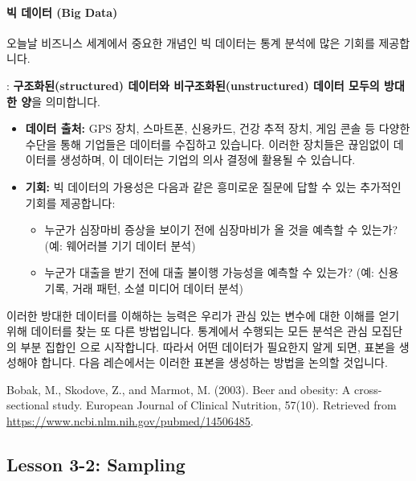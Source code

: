 \documentclass[11pt,a4paper]{article}
\begin{document}
\paragraph{빅 데이터 (Big Data)}
오늘날 비즈니스 세계에서 중요한 개념인 빅 데이터는 통계 분석에 많은 기회를 제공합니다.

\begin{tcolorbox}[mybox, title={빅 데이터 (Big Data)}]
: \textbf{구조화된(structured) 데이터와 비구조화된(unstructured) 데이터 모두의 방대한 양}을 의미합니다.
\end{tcolorbox}

\begin{itemize}
    \item \textbf{데이터 출처:} GPS 장치, 스마트폰, 신용카드, 건강 추적 장치, 게임 콘솔 등 다양한 수단을 통해 기업들은 데이터를 수집하고 있습니다. 이러한 장치들은 끊임없이 데이터를 생성하며, 이 데이터는 기업의 의사 결정에 활용될 수 있습니다.
    \item \textbf{기회:} 빅 데이터의 가용성은 다음과 같은 흥미로운 질문에 답할 수 있는 추가적인 기회를 제공합니다:
    \begin{itemize}
        \item 누군가 심장마비 증상을 보이기 전에 심장마비가 올 것을 예측할 수 있는가? (예: 웨어러블 기기 데이터 분석)
        \item 누군가 대출을 받기 전에 대출 불이행 가능성을 예측할 수 있는가? (예: 신용 기록, 거래 패턴, 소셜 미디어 데이터 분석)
    \end{itemize}
\end{itemize}
이러한 방대한 데이터를 이해하는 능력은 우리가 관심 있는 변수에 대한 이해를 얻기 위해 데이터를 찾는 또 다른 방법입니다. 통계에서 수행되는 모든 분석은 관심 모집단의 부분 집합인 으로 시작합니다. 따라서 어떤 데이터가 필요한지 알게 되면, 표본을 생성해야 합니다. 다음 레슨에서는 이러한 표본을 생성하는 방법을 논의할 것입니다.

\begin{tcolorbox}[mybox, title={학술 인용 (Academic Citation)}]
Bobak, M., Skodove, Z., and Marmot, M. (2003). Beer and obesity: A cross-sectional study. European Journal of Clinical Nutrition, 57(10). Retrieved from \url{https://www.ncbi.nlm.nih.gov/pubmed/14506485}.
\end{tcolorbox}

\newpage
\subsection{Lesson 3-2: Sampling}
\end{document}
